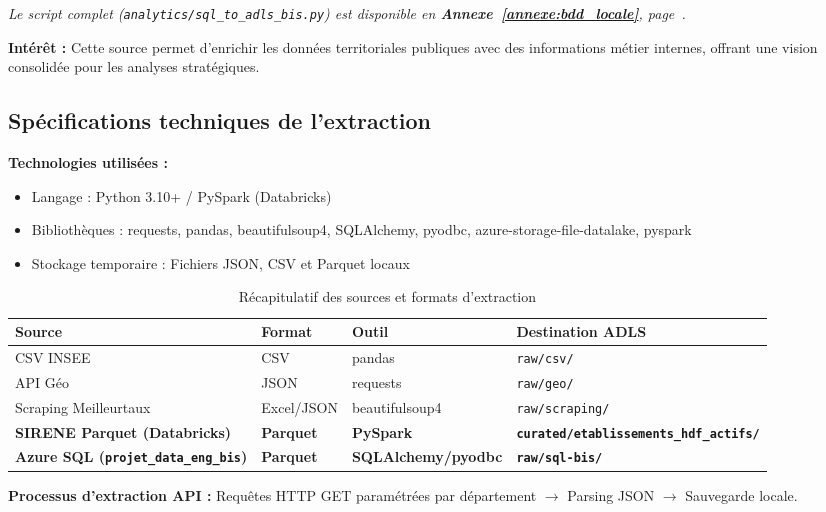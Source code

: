 \documentclass[12pt,a4paper]{article}
\begin{document}
\textit{Le script complet (\texttt{analytics/sql\_to\_adls\_bis.py}) est disponible en \textbf{Annexe~\ref{annexe:bdd_locale}}, page~\pageref{annexe:bdd_locale}.}

\textbf{Intérêt :} Cette source permet d'enrichir les données territoriales publiques avec des informations métier internes, offrant une vision consolidée pour les analyses stratégiques.

\subsection{Spécifications techniques de l'extraction}

\textbf{Technologies utilisées :}
\begin{itemize}
    \item Langage : Python 3.10+ / PySpark (Databricks)
    \item Bibliothèques : requests, pandas, beautifulsoup4, SQLAlchemy, pyodbc, azure-storage-file-datalake, pyspark
    \item Stockage temporaire : Fichiers JSON, CSV et Parquet locaux
\end{itemize}

\begin{table}[H]
\centering
\begin{tabular}{L{3.2cm} L{2.5cm} L{2.5cm} L{4.5cm}}
    \toprule
    \textbf{Source} & \textbf{Format} & \textbf{Outil} & \textbf{Destination ADLS} \\
    \midrule
    CSV INSEE & CSV & pandas & \texttt{raw/csv/} \\
    API Géo & JSON & requests & \texttt{raw/geo/} \\
    Scraping Meilleurtaux & Excel/JSON & beautifulsoup4 & \texttt{raw/scraping/} \\
    \textbf{SIRENE Parquet (Databricks)} & \textbf{Parquet} & \textbf{PySpark} & \textbf{\texttt{curated/etablissements\_hdf\_actifs/}} \\
    \textbf{Azure SQL (\texttt{projet\_data\_eng\_bis})} & \textbf{Parquet} & \textbf{SQLAlchemy/pyodbc} & \textbf{\texttt{raw/sql-bis/}} \\
    \bottomrule
\end{tabular}
\caption{Récapitulatif des sources et formats d'extraction}
\end{table}

\textbf{Processus d'extraction API :} Requêtes HTTP GET paramétrées par département $\to$ Parsing JSON $\to$ Sauvegarde locale.
\end{document}
